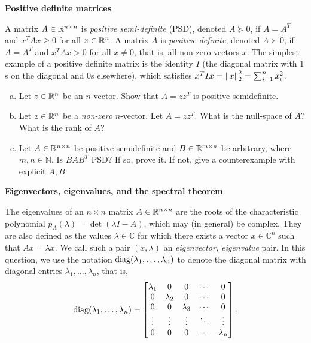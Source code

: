
\item {} \textbf{Positive definite matrices}

  A matrix $A \in \mathbb{R}^{n \times n}$ is \emph{positive semi-definite}
  (PSD), denoted $A \succeq 0$, if
  $A = A^T$ and $x^T A x \ge 0$ for all $x \in \mathbb{R}^n$.
  A matrix $A$ is \emph{positive definite}, denoted $A \succ 0$,
  if $A = A^T$ and $x^T A x > 0$ for all $x \neq 0$, that is,
  all non-zero vectors $x$. The simplest example of a positive
  definite matrix is the identity  $I$ (the diagonal matrix with $1$s on
  the diagonal and $0$s elsewhere), which satisfies
  $x^T I x = \left\|{x}\right\|_2^2 = \sum_{i = 1}^n x_i^2$.
  \begin{enumerate}[(a)]
  \item Let $z \in \mathbb{R}^n$ be an $n$-vector.
    Show that $A = zz^T$ is positive semidefinite.
    

  \item Let $z \in \mathbb{R}^n$ be a \emph{non-zero} $n$-vector.
    Let $A = zz^T$. What is the null-space of $A$?
    What is the rank of $A$?

   

  \item Let $A \in \mathbb{R}^{n \times n}$ be positive semidefinite and
    $B \in \mathbb{R}^{m \times n}$ be arbitrary, where $m, n \in \mathbb{N}$. Is
    $BAB^T$ PSD?  If so, prove it.  If not, give a counterexample with
    explicit $A, B$.

  \end{enumerate}

\newpage

  \item {} \textbf{Eigenvectors, eigenvalues, and the spectral
    theorem}

  The eigenvalues of an $n \times n$ matrix $A \in \mathbb{R}^{n \times n}$ are the
  roots of the characteristic polynomial $p_A(\lambda) = \det(\lambda I - A)$,
  which may (in general) be complex.  They are also defined as the values
  $\lambda \in \mathbb{C}$ for which there exists a vector
  $x \in \mathbb{C}^n$ such that $Ax = \lambda x$. We call such a pair
  $(x, \lambda)$ an \emph{eigenvector, eigenvalue} pair.
  In this question, we use the notation
  $\mathop{\rm diag}(\lambda_1, \ldots, \lambda_n)$ to denote the diagonal matrix with
  diagonal entries $\lambda_1, \ldots, \lambda_n$, that is,
    \begin{equation*}
      \mathop{\rm diag}(\lambda_1, \ldots, \lambda_n)
      = \left[\begin{matrix} \lambda_1 & 0 & 0 & \cdots & 0 \\
          0 & \lambda_2 & 0 & \cdots & 0 \\
          0 & 0 & \lambda_3 & \cdots & 0 \\
          \vdots & \vdots & \vdots & \ddots  & \vdots \\
          0 & 0 & 0 & \cdots & \lambda_n \end{matrix} \right].
    \end{equation*}
    
